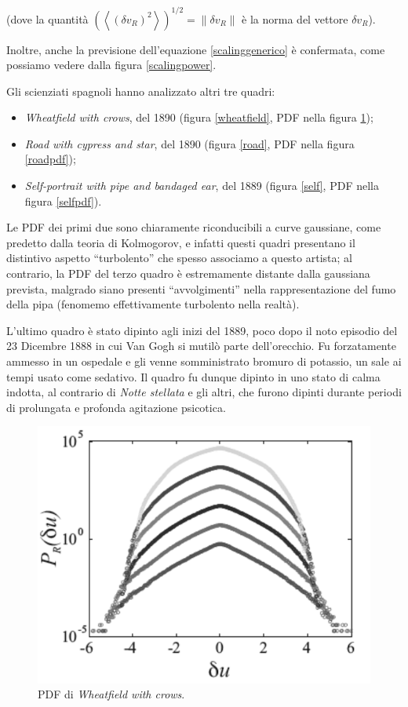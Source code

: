 \documentclass[12pt,a4paper]{article}
\newcommand{\norm}[1]{\left\lVert#1\right\rVert}
\numberwithin{equation}{section}
\begin{document}
(dove la quantità $\left(\left\langle
(\delta v_R )^2
\right\rangle\right)^{1/2} = \norm{\delta v_R}$ è la norma del vettore $\delta v_R$).

Inoltre, anche la previsione dell'equazione \eqref{scalinggenerico} è confermata, come possiamo vedere dalla figura \ref{scalingpower}.

Gli scienziati spagnoli hanno analizzato altri tre quadri:

\begin{itemize}
    \item \emph{Wheatfield with crows}, del 1890 (figura \ref{wheatfield}, PDF nella figura \ref{wheatfieldpdf});
    \item \emph{Road with cypress and star}, del 1890 (figura \ref{road}, PDF nella figura \ref{roadpdf});
    \item \emph{Self-portrait with pipe and bandaged ear}, del 1889 (figura \ref{self}, PDF nella figura \ref{selfpdf}).
\end{itemize}

Le PDF dei primi due sono chiaramente riconducibili a curve gaussiane, come predetto dalla teoria di Kolmogorov, e infatti questi quadri presentano il distintivo aspetto ``turbolento'' che spesso associamo a questo artista; al contrario, la PDF del terzo quadro è estremamente distante dalla gaussiana prevista, malgrado siano presenti ``avvolgimenti'' nella rappresentazione del fumo della pipa (fenomemo effettivamente turbolento nella realtà).

L'ultimo quadro è stato dipinto agli inizi del 1889, poco dopo il noto episodio del 23 Dicembre 1888 in cui Van Gogh si mutilò parte dell'orecchio. Fu forzatamente ammesso in un ospedale e gli venne somministrato bromuro di potassio, un sale ai tempi usato come sedativo. Il quadro fu dunque dipinto in uno stato di calma indotta, al contrario di \emph{Notte stellata} e gli altri, che furono dipinti durante periodi di prolungata e profonda agitazione psicotica.

\begin{figure}
    \centering
    \includegraphics[scale=0.4]{PDF_wheat.png}
    \caption{PDF di \emph{Wheatfield with crows}.}
    \label{wheatfieldpdf}
\end{figure}
\end{document}
